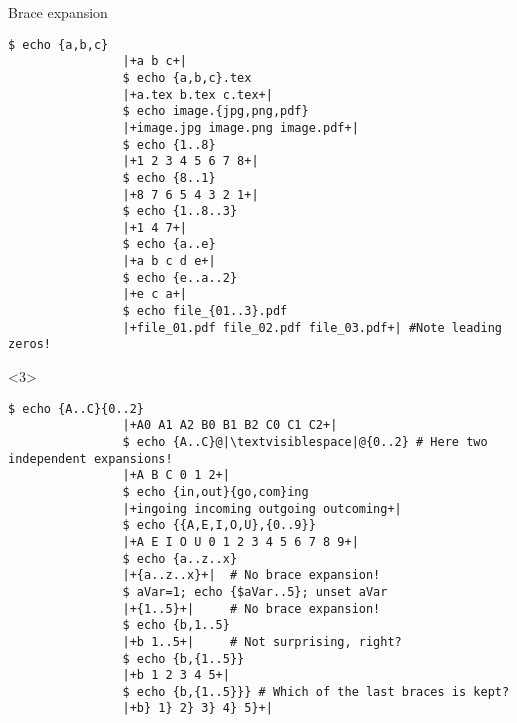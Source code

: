 \begin{frame}[fragile]{Brace expansion}
\begin{overlayarea}{\textwidth}{0.7\textheight}
\begin{onlyenv}
\begin{lstlisting}[style=MyBash, style=oddnumbers, aboveskip=3mm]
                $ echo {a,b,c}
                |+a b c+|
                $ echo {a,b,c}.tex
                |+a.tex b.tex c.tex+|
                $ echo image.{jpg,png,pdf}
                |+image.jpg image.png image.pdf+|
                $ echo {1..8}
                |+1 2 3 4 5 6 7 8+|
                $ echo {8..1}
                |+8 7 6 5 4 3 2 1+|
                $ echo {1..8..3}
                |+1 4 7+|
                $ echo {a..e}
                |+a b c d e+|
                $ echo {e..a..2}
                |+e c a+|
                $ echo file_{01..3}.pdf
                |+file_01.pdf file_02.pdf file_03.pdf+| #Note leading zeros!
            \end{lstlisting}
        \end{onlyenv}
        \begin{onlyenv}<3>
            \begin{lstlisting}[style=MyBash, style=oddnumbers, aboveskip=3mm, firstnumber=18]
                $ echo {A..C}{0..2}
                |+A0 A1 A2 B0 B1 B2 C0 C1 C2+|
                $ echo {A..C}@|\textvisiblespace|@{0..2} # Here two independent expansions!
                |+A B C 0 1 2+|
                $ echo {in,out}{go,com}ing
                |+ingoing incoming outgoing outcoming+|
                $ echo {{A,E,I,O,U},{0..9}}
                |+A E I O U 0 1 2 3 4 5 6 7 8 9+|
                $ echo {a..z..x}
                |+{a..z..x}+|  # No brace expansion!
                $ aVar=1; echo {$aVar..5}; unset aVar
                |+{1..5}+|     # No brace expansion!
                $ echo {b,1..5}
                |+b 1..5+|     # Not surprising, right?
                $ echo {b,{1..5}}
                |+b 1 2 3 4 5+|
                $ echo {b,{1..5}}} # Which of the last braces is kept?
                |+b} 1} 2} 3} 4} 5}+|
            \end{lstlisting}
        \end{onlyenv}
    \end{overlayarea}
\end{frame}
